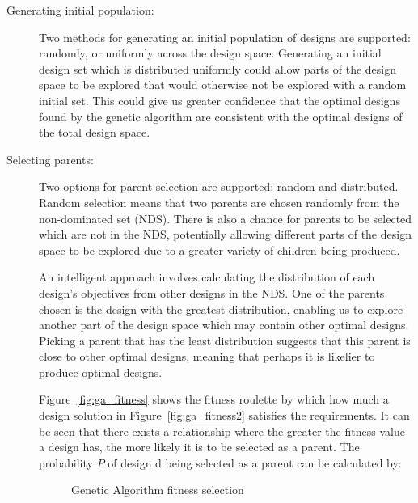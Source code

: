 \begin{description}
\item[Generating initial population:] Two methods for generating an initial population of designs are supported: randomly, or uniformly across the design space. Generating an initial design set which is distributed uniformly could allow parts of the design space to be explored that would otherwise not be explored with a random initial set. This could give us greater confidence that the optimal designs found by the genetic algorithm are consistent with the optimal designs of the total design space.
\item[Selecting parents:] Two options for parent selection are supported: random and distributed. Random selection means that two parents are chosen randomly from the non-dominated set (NDS). There is also a chance for parents to be selected which are not in the NDS, potentially allowing different parts of the design space to be explored due to a greater variety of children being produced.


An intelligent approach involves calculating the distribution of each design's objectives from other designs in the NDS. One of the parents chosen is the design with the greatest distribution, enabling us to explore another part of the design space which may contain other optimal designs. Picking a parent that has the least distribution suggests that this parent is close to other optimal designs, meaning that perhaps it is likelier to produce optimal designs.
		
Figure~\ref{fig:ga_fitness} shows the fitness roulette by which how much a design solution in Figure~\ref{fig:ga_fitness2} satisfies the requirements. It can be seen that there exists a relationship where the greater the fitness value a design has, the more likely it is to be selected as a parent. The probability $P$ of design d being selected as a parent can be calculated by:

\begin{figure}[htbp]
\begin{center}
\caption{Genetic Algorithm fitness selection}
\label{fig:ga_fitness_all}
\end{center}
\end{figure}



\end{description}
